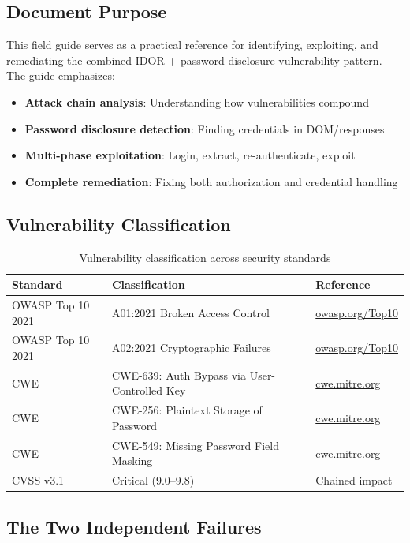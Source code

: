 \documentclass[11pt,letterpaper]{article}
\begin{document}
\subsection{Document Purpose}

This field guide serves as a practical reference for identifying, exploiting, and remediating the combined IDOR + password disclosure vulnerability pattern. The guide emphasizes:

\begin{itemize}
  \item \textbf{Attack chain analysis}: Understanding how vulnerabilities compound
  \item \textbf{Password disclosure detection}: Finding credentials in DOM/responses
  \item \textbf{Multi-phase exploitation}: Login, extract, re-authenticate, exploit
  \item \textbf{Complete remediation}: Fixing both authorization and credential handling
\end{itemize}

\subsection{Vulnerability Classification}

\begin{table}[h]
\centering
\begin{tabular}{@{}lll@{}}
\toprule
\textbf{Standard} & \textbf{Classification} & \textbf{Reference} \\
\midrule
OWASP Top 10 2021 & A01:2021 Broken Access Control & \url{owasp.org/Top10} \\
OWASP Top 10 2021 & A02:2021 Cryptographic Failures & \url{owasp.org/Top10} \\
CWE & CWE-639: Auth Bypass via User-Controlled Key & \url{cwe.mitre.org} \\
CWE & CWE-256: Plaintext Storage of Password & \url{cwe.mitre.org} \\
CWE & CWE-549: Missing Password Field Masking & \url{cwe.mitre.org} \\
CVSS v3.1 & Critical (9.0--9.8) & Chained impact \\
\bottomrule
\end{tabular}
\caption{Vulnerability classification across security standards}
\end{table}

\subsection{The Two Independent Failures}
\end{document}
